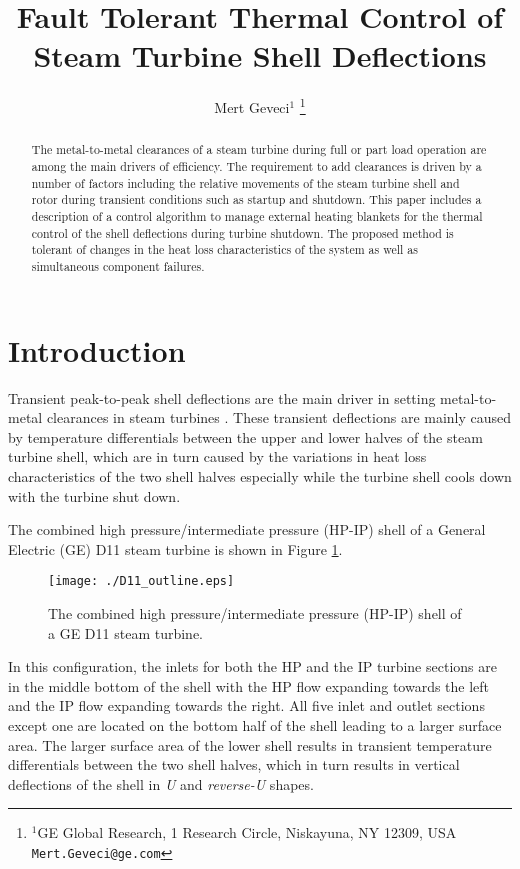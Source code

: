 \documentclass[a4paper, 10pt, conference]{ieeeconf}      %
\title{\LARGE \bf
Fault Tolerant Thermal Control of Steam Turbine Shell Deflections}
\author{Mert Geveci$^{1}$%
\thanks{$^{1}$GE Global Research,
        1 Research Circle, Niskayuna, NY 12309, USA
        {\tt\small Mert.Geveci@ge.com}}%
}
\begin{document}
\maketitle
\thispagestyle{empty}
\pagestyle{empty}


\begin{abstract}
The metal-to-metal clearances of a steam turbine during full or part load operation are among the main drivers of efficiency. The requirement to add clearances is driven by a number of factors including the relative movements of the steam turbine shell and rotor during transient conditions such as startup and shutdown. This paper includes a description of a control algorithm to manage external heating blankets for the thermal control of the shell deflections during turbine shutdown. The proposed method is tolerant of changes in the heat loss characteristics of the system as well as simultaneous component failures.
\end{abstract}


\section{Introduction \label{sec:Problem-Description}}
Transient peak-to-peak shell deflections are the main driver in setting metal-to-metal clearances in steam turbines \cite{Ekbote2008}. These transient deflections are mainly caused by temperature differentials between the upper and lower halves of the steam turbine shell, which are in turn caused by the variations in heat loss characteristics of the two shell halves \cite{Ekbote2008} especially while the turbine shell cools down with the turbine shut down. 

The combined high pressure/intermediate pressure (HP-IP) shell of a General Electric (GE) D11 steam turbine is shown in Figure \ref{fig:Turbine-Outline}. 
\begin{figure}
\centering
\texttt{[image: ./D11\_outline.eps]}
\caption{\label{fig:Turbine-Outline} The combined high pressure/intermediate pressure (HP-IP) shell of a GE D11 steam turbine. }
\end{figure}
In this configuration, the inlets for both the HP and the IP turbine sections are in the middle bottom of the shell with the HP flow expanding towards the left and the IP flow expanding towards the right. All five inlet and outlet sections except one are located on the bottom half of the shell leading to a larger surface area. The larger surface area of the lower shell results in transient temperature differentials between the two shell halves, which in turn results in vertical deflections of the shell in \emph{U} and \emph{reverse-U} shapes.  
\end{document}
